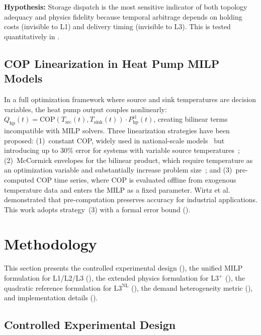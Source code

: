 \documentclass[review,3p]{elsarticle}
\newcommand{\Lplus}{\mathrm{L3}^{+}}
\newcommand{\Lnl}{\mathrm{L3}^{\mathrm{NL}}}
\begin{document}
\textbf{Hypothesis:} Storage dispatch is the most sensitive
indicator of both topology adequacy and physics fidelity because
temporal arbitrage depends on holding costs (invisible to L1) and
delivery timing (invisible to L3). This is tested quantitatively in
.

\subsection{COP Linearization in Heat Pump MILP Models}
\label{sec:rw_cop}

In a full optimization framework where source and sink temperatures
are decision variables, the heat pump output couples nonlinearly:
$Q_{\mathrm{hp}}(t) = \mathrm{COP}(T_{\mathrm{src}}(t),
T_{\mathrm{sink}}(t)) \cdot P_{\mathrm{hp}}^{\mathrm{el}}(t)$,
creating bilinear terms incompatible with MILP solvers. Three
linearization strategies have been proposed:
(1)~constant COP, widely used in national-scale
models~\cite{Connolly2014_EnergyPLAN,Brown2018_pypsa} but
introducing up to 30\% error for systems with variable source
temperatures~\cite{Ommen2016};
(2)~McCormick envelopes for the bilinear product, which require
temperature as an optimization variable and substantially increase
problem size~\cite{Castillo2015}; and
(3)~pre-computed COP time series, where COP is evaluated offline
from exogenous temperature data and enters the MILP as a fixed
parameter. Wirtz et al.~\cite{Wirtz2018_COP} demonstrated that
pre-computation preserves accuracy for industrial applications.
This work adopts strategy~(3) with a formal error bound
().

\section{Methodology}
\label{sec:methodology}

This section presents the controlled experimental design
(), the unified MILP formulation for
L1/L2/L3 (), the extended physics formulation for
$\Lplus$ (), the quadratic reference
formulation for $\Lnl$ (), the demand
heterogeneity metric (), and implementation
details ().

\subsection{Controlled Experimental Design}
\label{sec:exp_design}
\end{document}
